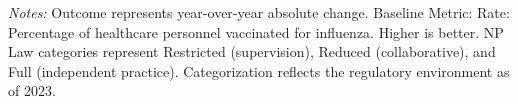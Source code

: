 \begin{table}[htbp]
    \centering
    \caption{Summary of Change in ASC-8: Influenza Vaccination Coverage by Authority and Year}
    \label{tab:d_asc_rate_8}
    \vspace{0.2cm}
    \vspace{0.1cm}
    \begin{minipage}{\textwidth}
        \footnotesize \textit{Notes:} Outcome represents year-over-year absolute change. Baseline Metric: Rate: Percentage of healthcare personnel vaccinated for influenza. Higher is better. NP Law categories represent Restricted (supervision), Reduced (collaborative), and Full (independent practice). Categorization reflects the regulatory environment as of 2023.
    \end{minipage}
\end{table}